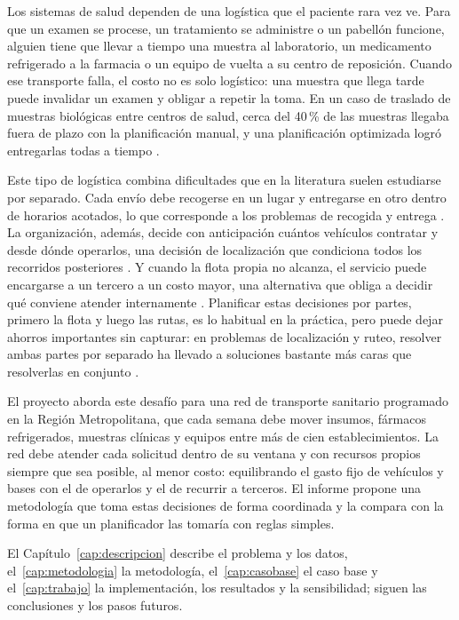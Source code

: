 Los sistemas de salud dependen de una logística que el paciente rara vez ve. Para que un examen se procese, un tratamiento se administre o un pabellón funcione, alguien tiene que llevar a tiempo una muestra al laboratorio, un medicamento refrigerado a la farmacia o un equipo de vuelta a su centro de reposición. Cuando ese transporte falla, el costo no es solo logístico: una muestra que llega tarde puede invalidar un examen y obligar a repetir la toma. En un caso de traslado de muestras biológicas entre centros de salud, cerca del 40\,\% de las muestras llegaba fuera de plazo con la planificación manual, y una planificación optimizada logró entregarlas todas a tiempo \cite{benini_detti_zabalo_2021}.

Este tipo de logística combina dificultades que en la literatura suelen estudiarse por separado. Cada envío debe recogerse en un lugar y entregarse en otro dentro de horarios acotados, lo que corresponde a los problemas de recogida y entrega \cite{parragh_doerner_hartl_2008}. La organización, además, decide con anticipación cuántos vehículos contratar y desde dónde operarlos, una decisión de localización que condiciona todos los recorridos posteriores \cite{prodhon_prins_2014}. Y cuando la flota propia no alcanza, el servicio puede encargarse a un tercero a un costo mayor, una alternativa que obliga a decidir qué conviene atender internamente \cite{dabia_lai_vigo_2019}. Planificar estas decisiones por partes, primero la flota y luego las rutas, es lo habitual en la práctica, pero puede dejar ahorros importantes sin capturar: en problemas de localización y ruteo, resolver ambas partes por separado ha llevado a soluciones bastante más caras que resolverlas en conjunto \cite{prodhon_prins_2014}.

El proyecto aborda este desafío para una red de transporte sanitario programado en la Región Metropolitana, que cada semana debe mover insumos, fármacos refrigerados, muestras clínicas y equipos entre más de cien establecimientos. La red debe atender cada solicitud dentro de su ventana y con recursos propios siempre que sea posible, al menor costo: equilibrando el gasto fijo de vehículos y bases con el de operarlos y el de recurrir a terceros. El informe propone una metodología que toma estas decisiones de forma coordinada y la compara con la forma en que un planificador las tomaría con reglas simples.

El Capítulo~\ref{cap:descripcion} describe el problema y los datos, el~\ref{cap:metodologia} la metodología, el~\ref{cap:casobase} el caso base y el~\ref{cap:trabajo} la implementación, los resultados y la sensibilidad; siguen las conclusiones y los pasos futuros.
